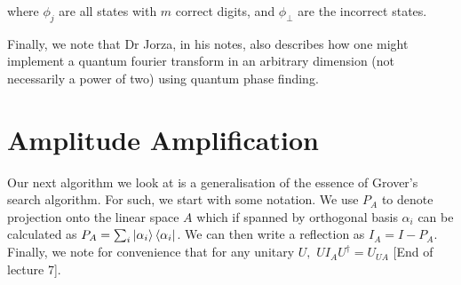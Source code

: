 \documentclass{article}
\theoremstyle{definition}
\begin{document}
where $\phi_j$ are all states with $m$ correct digits, and $\phi_\perp$ are the
incorrect states.

Finally, we note that Dr Jorza, in his notes, also describes how one might
implement a quantum fourier transform in an arbitrary dimension (not necessarily
a power of two) using quantum phase finding.

\section{Amplitude Amplification}

Our next algorithm we look at is a generalisation of the essence of Grover's
search algorithm. For such, we start with some notation. We use $P_A$ to denote
projection onto the linear space $A$ which if spanned by orthogonal basis
$\alpha_i$ can be calculated as $P_A = \sum_i \ket{\alpha_i}\bra{\alpha_i}$. We
can then write a reflection as $I_A = I - P_A$. Finally, we note for convenience
that for any unitary $U,$ $UI_AU^\dagger = U_{UA}$ [End of lecture 7].
\end{document}
